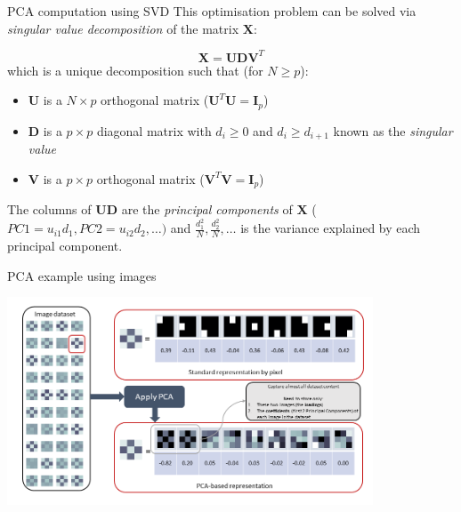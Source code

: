 \documentclass[notes]{beamer}          %
\begin{document}
\begin{frame}{PCA computation using SVD}
This optimisation problem can be solved via \textit{singular value decomposition} of the matrix $\mathbf X$:

\begin{equation*}
\mathbf X = \mathbf{UDV}^T
\end{equation*}
which is a unique decomposition such that (for $N \ge p$):

\begin{itemize}
\item $\mathbf{U}$ is a $N \times p$ orthogonal matrix ($\mathbf{U}^T\mathbf{U}=\mathbf{I}_p$)
\item $\mathbf{D}$ is a $p \times p$ diagonal matrix with $d_i \ge 0$ and $d_{i} \ge d_{i+1}$ known as the \textit{singular value}
\item $\mathbf{V}$ is a $p \times p$ orthogonal matrix ($\mathbf{V}^T\mathbf{V}=\mathbf{I}_p$)

\end{itemize}

The columns of $\mathbf{UD}$ are the \textit{principal components} of $\mathbf{X}$ ($PC1=u_{i1}d_1, PC2=u_{i2}d_2, \dots)$ and $\frac{d_{1}^2}{N}, \frac{d_{2}^2}{N}, \dots$ is the variance explained by each principal component.
\end{frame}

\begin{frame}{PCA example using images}
\begin{center}
\includegraphics[height=6.2cm]{../figures/week_6/pca_image_example.png}  
\end{center}
\end{frame}
\end{document}
